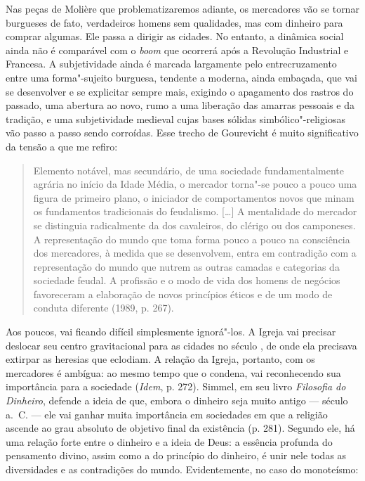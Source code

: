 Nas peças de Molière que problematizaremos adiante, os mercadores vão se
tornar burgueses de fato, verdadeiros homens sem qualidades, mas com
dinheiro para comprar algumas. Ele passa a dirigir as cidades. No
entanto, a dinâmica social ainda não é comparável com o \emph{boom} que
ocorrerá após a Revolução Industrial e Francesa. A subjetividade ainda é
marcada largamente pelo entrecruzamento entre uma forma"-sujeito
burguesa, tendente a moderna, ainda embaçada, que vai se desenvolver e
se explicitar sempre mais, exigindo o apagamento dos rastros do passado,
uma abertura ao novo, rumo a uma liberação das amarras pessoais e da
tradição, e uma subjetividade medieval cujas bases sólidas
simbólico"-religiosas vão passo a passo sendo corroídas. Esse trecho de
Gourevicht é muito significativo da tensão a que me refiro:

\begin{quote}
Elemento notável, mas secundário, de uma sociedade fundamentalmente
agrária no início da Idade Média, o mercador torna"-se pouco a pouco uma
figura de primeiro plano, o iniciador de comportamentos novos que minam
os fundamentos tradicionais do feudalismo. [\ldots{}] A mentalidade
do mercador se distinguia radicalmente da dos cavaleiros, do clérigo ou
dos camponeses. A representação do mundo que toma forma pouco a pouco na
consciência dos mercadores, à medida que se desenvolvem, entra em
contradição com a representação do mundo que nutrem as outras camadas e
categorias da sociedade feudal. A profissão e o modo de vida dos homens
de negócios favoreceram a elaboração de novos princípios éticos e de um
modo de conduta diferente (1989, p. 267).
\end{quote}

Aos poucos, vai ficando difícil simplesmente ignorá"-los. A Igreja vai
precisar deslocar seu centro gravitacional para as cidades no século
, de onde ela precisava extirpar as heresias que eclodiam. A relação
da Igreja, portanto, com os mercadores é ambígua: ao mesmo tempo que o
condena, vai reconhecendo sua importância para a sociedade (\emph{Idem},
p. 272). Simmel, em seu livro \emph{Filosofia do Dinheiro},
defende a ideia de que, embora o dinheiro seja muito antigo --- século
 a.~C. --- ele vai ganhar muita importância em sociedades em que a
religião ascende ao grau absoluto de objetivo final da existência (p.
281). Segundo ele, há uma relação forte entre o dinheiro e a ideia de
Deus: a essência profunda do pensamento divino, assim como a do
princípio do dinheiro, é unir nele todas as diversidades e as
contradições do mundo. Evidentemente, no caso do monoteísmo:

